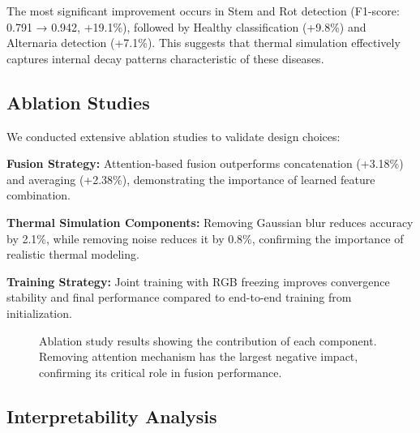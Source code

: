 \documentclass[conference]{IEEEtran}
\begin{document}
The most significant improvement occurs in Stem and Rot detection (F1-score: 0.791 → 0.942, +19.1\%), followed by Healthy classification (+9.8\%) and Alternaria detection (+7.1\%). This suggests that thermal simulation effectively captures internal decay patterns characteristic of these diseases.

\subsection{Ablation Studies}

We conducted extensive ablation studies to validate design choices:

\textbf{Fusion Strategy:} Attention-based fusion outperforms concatenation (+3.18\%) and averaging (+2.38\%), demonstrating the importance of learned feature combination.

\textbf{Thermal Simulation Components:} Removing Gaussian blur reduces accuracy by 2.1\%, while removing noise reduces it by 0.8\%, confirming the importance of realistic thermal modeling.

\textbf{Training Strategy:} Joint training with RGB freezing improves convergence stability and final performance compared to end-to-end training from initialization.

\begin{figure}[htbp]
\centering
{}
\caption{Ablation study results showing the contribution of each component. Removing attention mechanism has the largest negative impact, confirming its critical role in fusion performance.}
\label{fig:ablation_study}
\end{figure}

\subsection{Interpretability Analysis}
\end{document}
